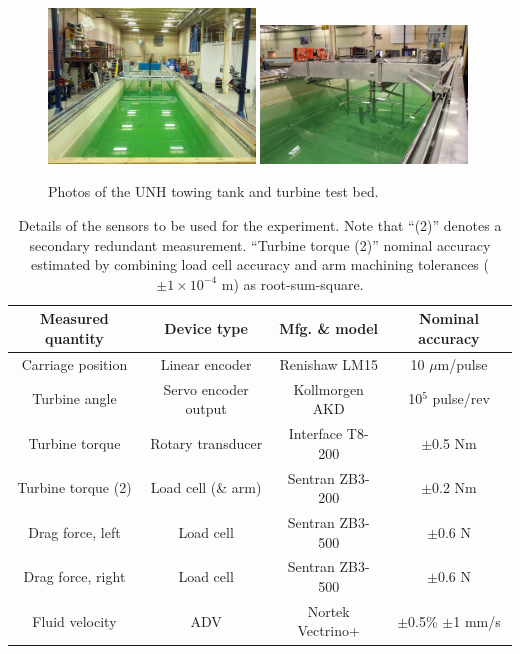 \documentclass[12pt,letterpaper]{scrreprt}
\begin{document}
\begin{figure}[ht!]
\centering 
\includegraphics[clip,trim=0 0.4in 0 0.37in, 
width=0.49\textwidth]{Figures/tow_tank_length} 
\includegraphics[clip,trim=0.67in 0 0 0, 
width=0.49\textwidth]{Figures/test_bed_photo} 
\caption{Photos of the UNH towing tank and turbine test bed.} 
\label{fig-tow_tank}
\end{figure}


\begin{table}[ht]
\centering
\begin{tabular}{c|c|c|c}
Measured quantity & Device type & Mfg. \& model & Nominal accuracy \\
\hline 
Carriage position & Linear encoder & Renishaw LM15 & 10 $\mu$m/pulse \cite{RenishawLM15}\\
Turbine angle & Servo encoder output & Kollmorgen AKD & 10$^5$ pulse/rev \cite{KollmorgenAKD}\\
Turbine torque & Rotary transducer & Interface T8-200 & $\pm$0.5 Nm \cite{InterfaceT8}\\ 
Turbine torque (2) & Load cell (\& arm) & Sentran ZB3-200 & $\pm$0.2 Nm \cite{SentranZB}\\
Drag force, left & Load cell & Sentran ZB3-500 & $\pm$0.6 N \cite{SentranZB}\\
Drag force, right & Load cell & Sentran ZB3-500 & $\pm$0.6 N \cite{SentranZB}\\
Fluid velocity & ADV & Nortek Vectrino+ & $\pm$0.5\% $\pm$1 mm/s \cite{NortekVectrino}\\
\end{tabular}
\caption{Details of the sensors to be used for the experiment. Note that ``(2)''
denotes a secondary redundant measurement. ``Turbine torque (2)'' nominal
accuracy estimated by combining load cell accuracy and arm machining tolerances
($\pm 1 \times 10^{-4}$ m) as root-sum-square.} \label{tab-sensors}
\end{table}
\end{document}
